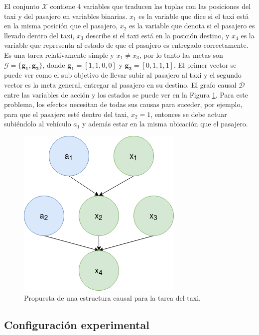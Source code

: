 El conjunto $\mathcal{X}$ contiene 4 variables que traducen las tuplas con las posiciones del taxi y del pasajero en variables binarias. $x_1$
es la variable que dice si el taxi está en la misma posición que el
pasajero, $x_2$ es la variable que denota si el pasajero es llevado dentro del taxi, $x_3$ describe si el taxi está en la posición destino,
y $x_4$ es la variable que representa al estado de que el pasajero es entregado correctamente. Es una tarea relativamente simple y $x_1 \neq x_3$, por lo tanto las metas son $\mathcal{G} = \{\mathbf{g_1}, \mathbf{g_2}\}$, donde $\mathbf{g_1} = [1, 1, 0 , 0]$ y $\mathbf{g_2} = [0,1,1,1]$. El primer vector se puede ver como el sub objetivo de 
llevar subir al pasajero al taxi y el segundo vector es la meta general, 
entregar al pasajero en su destino.
El grafo causal $\mathcal{D}$ entre las variables de acción y los estados se puede 
ver en la Figura \ref{fig:cm-taxi}. Para este problema, los efectos
necesitan de todas sus causas para suceder, por ejemplo, para que el
pasajero esté dentro del taxi, $x_2 = 1$, entonces se debe actuar
subiéndolo al vehículo $a_1$ y además estar en la misma ubicación que
el pasajero.

\begin{figure}[H]
    \centering
    \includegraphics[scale=0.3]{Chapter5/Figs/causal_structure_taxi.png}
    \caption{Propuesta de una estructura causal para la tarea del taxi.}
    \label{fig:cm-taxi}
\end{figure}


\subsection{Configuración experimental}

